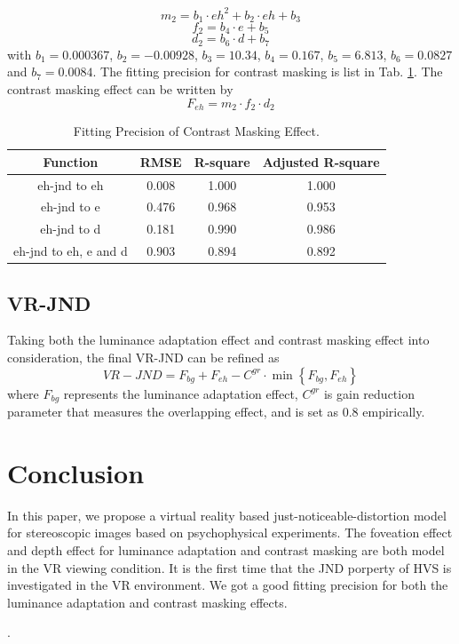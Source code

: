 \documentclass[journal]{IEEEtran}
\begin{document}
\begin{equation}
m_2=b_1\cdot eh^2+b_2\cdot eh+b_3
\end{equation}
\begin{equation}
f_2=b_4\cdot e+b_5
\end{equation}
\begin{equation}
d_2=b_6\cdot d+b_7
\end{equation}
with $b_1=0.000367$, $b_2=-0.00928$, $b_3=10.34$, $b_4=0.167$, $b_5=6.813$, $b_6=0.0827$ and $b_7=0.0084$.
The fitting precision for contrast masking is list in Tab. \ref{tab:fit_precition_eh}. The contrast masking effect can be written by
\begin{equation}
F_{eh}=m_2\cdot f_2 \cdot d_2
\end{equation}
\begin{table}[htbp] 
	\centering
	\caption{Fitting Precision of Contrast Masking Effect.}
	\begin{tabular}{|c|c|c|c|}
		\hline
		Function & RMSE & R-square & Adjusted R-square \\
		\hline
		eh-jnd to eh & 0.008 & 1.000 & 1.000 \\
		\hline
		eh-jnd to e & 0.476 & 0.968 & 0.953 \\
		\hline
		eh-jnd to d & 0.181 & 0.990 & 0.986 \\
		\hline
		eh-jnd to eh, e and d & 0.903 & 0.894 & 0.892 \\
		\hline
	\end{tabular}%
	\label{tab:fit_precition_eh}%
\end{table}%

\subsection{VR-JND}
Taking both the luminance adaptation effect and contrast masking effect into consideration, the final VR-JND can be refined as
\begin{equation}
VR-JND= F_{bg}+F_{eh}-C^{gr}\cdot \min \left\{F_{bg}, F_{eh}\right\}
\end{equation}
where $F_{bg}$ represents the luminance adaptation effect, $C^{gr}$ is gain reduction parameter that measures the overlapping effect, and is set as $0.8$ empirically.

\section{Conclusion}
In this paper, we propose a virtual reality based just-noticeable-distortion model for stereoscopic images based on psychophysical experiments. The foveation effect and depth effect for luminance adaptation and contrast masking are both model in the VR viewing condition. It is the first time that the JND porperty of HVS is investigated in the VR environment. We got a good fitting precision for both the luminance adaptation and contrast masking effects.

.

\ifCLASSOPTIONcaptionsoff
  \newpage
\fi

{
	\small
	
	
}
\end{document}
